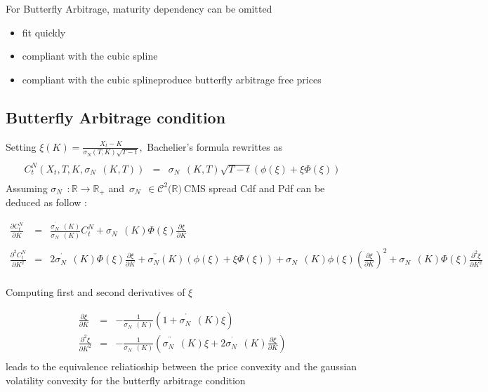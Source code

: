 \documentclass[3pt]{article}
\begin{document}
For Butterfly Arbitrage, maturity dependency can be omitted

\bigskip 

\begin{itemize}
\item fit quickly

\item compliant with the cubic spline

\item compliant with the cubic splineproduce butterfly arbitrage free prices
\end{itemize}

\subsection{Butterfly Arbitrage condition}

\bigskip 

Setting $\xi (K)=\frac{X_{t}-K}{\sigma _{N}(T,K)\sqrt{T-t}},$ Bachelier's
formula rewrittes as%
\begin{eqnarray*}
&& \\
C_{t}^{N}(X_{t},T,K,\sigma _{N\text{ }}(K,T)) &=&\sigma _{N\text{ }}(K,T)%
\sqrt{T-t}\left( \phi (\xi )+\xi \Phi (\xi )\right)  \\
&&
\end{eqnarray*}%
Assuming $\sigma _{N\text{ }}:\mathbb{R\rightarrow R}_{+}$ and\ $\sigma _{N%
\text{ }}\in \mathcal{C}^{2}\mathbb{(}\mathbb{R})\ $CMS spread Cdf and Pdf
can be deduced as follow :

\begin{eqnarray*}
\frac{\partial C_{t}^{N}}{\partial K} &=&\frac{\sigma _{N\text{ }}^{^{\prime
}}(K)}{\sigma _{N\text{ }}(K)}C_{t}^{N}+\sigma _{N\text{ }}(K)\Phi (\xi )%
\frac{\partial \xi }{\partial K} \\
&& \\
\frac{\partial ^{2}C_{t}^{N}}{\partial K^{2}} &=&2\sigma _{N\text{ }%
}^{^{\prime }}(K)\Phi (\xi )\frac{\partial \xi }{\partial K}+\sigma _{N\text{
}}^{^{\prime \prime }}(K)\left( \phi (\xi )+\xi \Phi (\xi )\right) +\sigma
_{N\text{ }}(K)\phi (\xi )\left( \frac{\partial \xi }{\partial K}\right)
^{2}+\sigma _{N\text{ }}(K)\Phi (\xi )\frac{\partial ^{2}\xi }{\partial K^{2}%
} \\
&&
\end{eqnarray*}

Computing first and second derivatives of $\xi $

\begin{eqnarray*}
\frac{\partial \xi }{\partial K} &=&-\frac{1}{\sigma _{N\text{ }}(K)}\left(
1+\sigma _{N\text{ }}^{^{\prime }}(K)\xi \right)  \\
\frac{\partial ^{2}\xi }{\partial K^{2}} &=&-\frac{1}{\sigma _{N\text{ }}(K)}%
\left( \sigma _{N\text{ }}^{^{\prime \prime }}(K)\xi +2\sigma _{N\text{ }%
}^{^{\prime }}(K)\frac{\partial \xi }{\partial K}\right)  \\
&&
\end{eqnarray*}%
leads to the equivalence reliatioship between the price convexity and the
gaussian volatility convexity for the butterfly arbitrage condition
\end{document}
